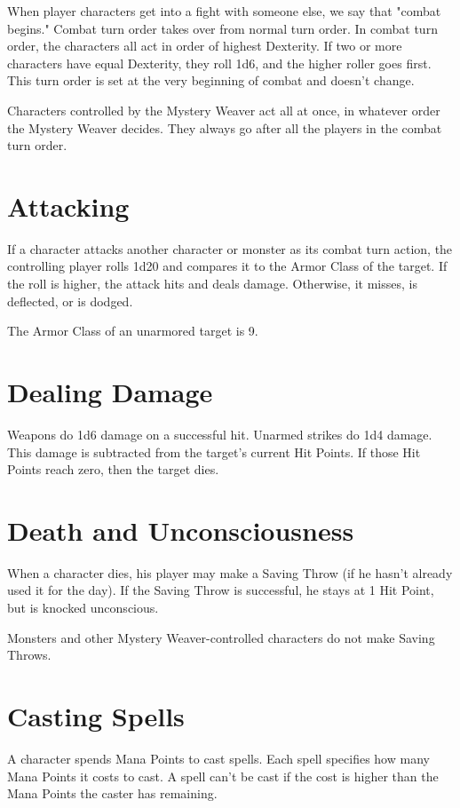 \begin{multicols}{2}
When player characters get into a fight with someone else, we say that
"combat begins." Combat turn order takes over from normal turn order.
In combat turn order, the characters all act in order of highest Dexterity.
If two or more characters have equal Dexterity, they roll 1d6, and the
higher roller goes first. This turn order is set at the very beginning of
combat and doesn't change.

Characters controlled by the Mystery Weaver act all at once, in whatever
order the Mystery Weaver decides. They always go after all the players
in the combat turn order.

\section{Attacking}

If a character attacks another character or monster as its combat turn
action, the controlling player rolls 1d20 and compares it to the Armor
Class of the target. If the roll is higher, the attack hits and deals
damage. Otherwise, it misses, is deflected, or is dodged.

The Armor Class of an unarmored target is 9.

\section{Dealing Damage}

Weapons do 1d6 damage on a successful hit. Unarmed strikes do 1d4 damage.
This damage is subtracted from the target's current Hit Points. If those
Hit Points reach zero, then the target dies.

\section{Death and Unconsciousness}

When a character dies, his player may make a Saving Throw (if he hasn't
already used it for the day). If the Saving Throw is successful, he stays
at 1 Hit Point, but is knocked unconscious.

Monsters and other Mystery Weaver-controlled characters do not make Saving
Throws.

\section{Casting Spells}

A character spends Mana Points to cast spells. Each spell specifies how
many Mana Points it costs to cast. A spell can't be cast if the cost
is higher than the Mana Points the caster has remaining.


\end{multicols}
